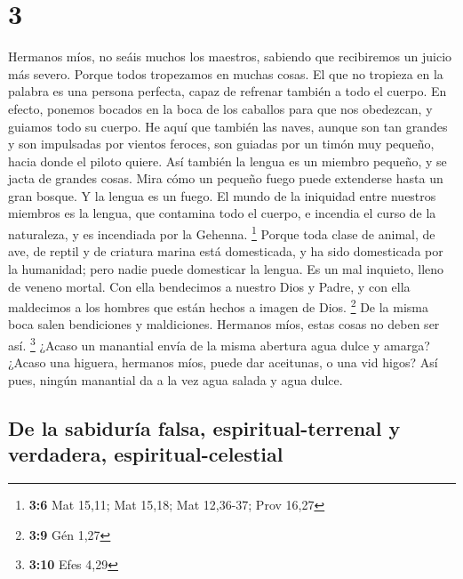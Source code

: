 \hypertarget{section-2}{%
\section{3}\label{section-2}}

 Hermanos míos, no seáis muchos los maestros, sabiendo que
recibiremos un juicio más severo.  Porque todos tropezamos
en muchas cosas. El que no tropieza en la palabra es una persona
perfecta, capaz de refrenar también a todo el cuerpo.  En
efecto, ponemos bocados en la boca de los caballos para que nos
obedezcan, y guiamos todo su cuerpo.  He aquí que también
las naves, aunque son tan grandes y son impulsadas por vientos feroces,
son guiadas por un timón muy pequeño, hacia donde el piloto quiere.
 Así también la lengua es un miembro pequeño, y se jacta
de grandes cosas. Mira cómo un pequeño fuego puede extenderse hasta un
gran bosque.  Y la lengua es un fuego. El mundo de la
iniquidad entre nuestros miembros es la lengua, que contamina todo el
cuerpo, e incendia el curso de la naturaleza, y es incendiada por la
Gehenna. \footnote{\textbf{3:6} Mat 15,11; Mat 15,18; Mat 12,36-37; Prov
  16,27}  Porque toda clase de animal, de ave, de reptil y
de criatura marina está domesticada, y ha sido domesticada por la
humanidad;  pero nadie puede domesticar la lengua. Es un
mal inquieto, lleno de veneno mortal.  Con ella bendecimos
a nuestro Dios y Padre, y con ella maldecimos a los hombres que están
hechos a imagen de Dios. \footnote{\textbf{3:9} Gén 1,27}
 De la misma boca salen bendiciones y maldiciones.
Hermanos míos, estas cosas no deben ser así. \footnote{\textbf{3:10}
  Efes 4,29}  ¿Acaso un manantial envía de la misma
abertura agua dulce y amarga?  ¿Acaso una higuera,
hermanos míos, puede dar aceitunas, o una vid higos? Así pues, ningún
manantial da a la vez agua salada y agua dulce.

\hypertarget{de-la-sabiduruxeda-falsa-espiritual-terrenal-y-verdadera-espiritual-celestial}{%
\subsection{De la sabiduría falsa, espiritual-terrenal y verdadera,
espiritual-celestial}\label{de-la-sabiduruxeda-falsa-espiritual-terrenal-y-verdadera-espiritual-celestial}}


